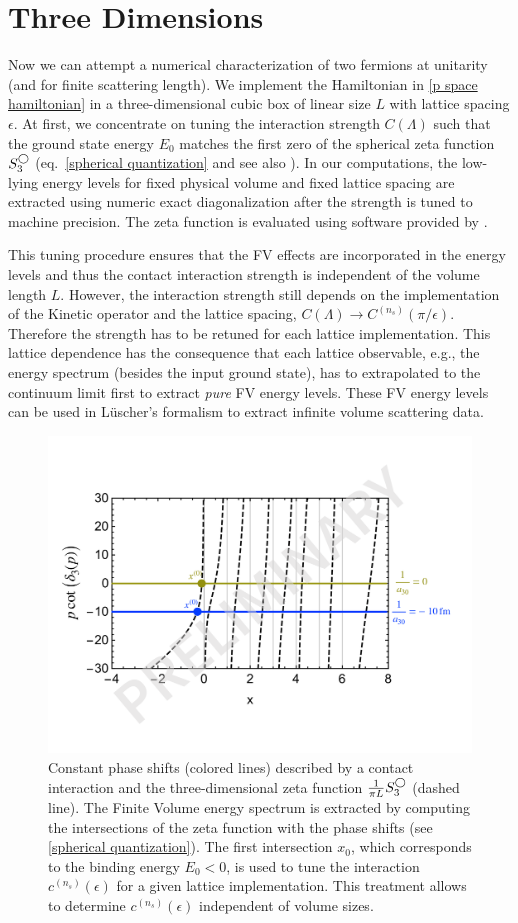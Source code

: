 \section{Three Dimensions}\label{sec:3D}


Now we can attempt a numerical characterization of two fermions at unitarity (and for finite scattering length).
We implement the Hamiltonian in \eqref{p space hamiltonian} in a three-dimensional cubic box of linear size $L$ with lattice spacing $\epsilon$.
At first, we concentrate on tuning the interaction strength $C(\Lambda)$ such that the ground state energy $E_0$ matches the first zero of the spherical zeta function $S^{\bigcirc}_3$ (eq.~\eqref{spherical quantization} and see also ).
In our computations, the low-lying energy levels for fixed physical volume and fixed lattice spacing are extracted using numeric exact diagonalization after the strength is tuned to machine precision.
The zeta function is evaluated using software provided by .

This tuning procedure ensures that the FV effects are incorporated in the energy levels and thus the contact interaction strength is independent of the volume length $L$.
However, the interaction strength still depends on the implementation of the Kinetic operator and the lattice spacing, $C(\Lambda)\to C^{(n_s)}(\pi/\epsilon)$.
Therefore the strength has to be retuned for each lattice implementation.
This lattice dependence has the consequence that each lattice observable, e.g., the energy spectrum (besides the input ground state), has to extrapolated to the continuum limit first to extract \textit{pure} FV energy levels.
These FV energy levels can be used in L\"uscher's formalism to extract infinite volume scattering data.

\begin{figure}
\center
\includegraphics[width=.7\textwidth]{figure/tuning.pdf}
\caption{\label{fig:tuning}
    Constant phase shifts (colored lines) described by a contact interaction and the three-dimensional zeta function $\frac{1}{\pi L} S^{\bigcirc}_3$ (dashed line).
    The Finite Volume energy spectrum is extracted by computing the intersections of the zeta function with the phase shifts (see \eqref{spherical quantization}).
    The first intersection $x_0$, which corresponds to the binding energy $E_0 < 0$, is used to tune the interaction $c^{(n_s)}(\epsilon)$ for a given lattice implementation.
    This treatment allows to determine $c^{(n_s)}(\epsilon)$ independent of volume sizes.
}
\end{figure}

